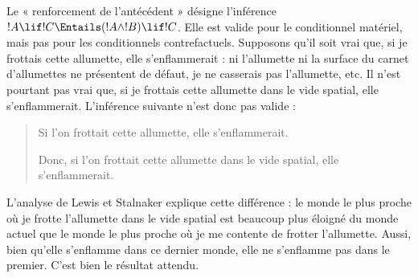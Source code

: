 \documentclass[../../../include/open-logic-section]{subfiles}
\begin{document}


Le « renforcement de l'antécédent » désigne l'inférence
$!A \lif !C \Entails (!A \land !B) \lif !C$. Elle est valide pour le
conditionnel matériel, mais pas pour les conditionnels
contrefactuels. Supposons qu'il soit vrai que, si je frottais cette
allumette, elle s'enflammerait : ni l'allumette ni la surface du
carnet d'allumettes ne présentent de défaut, je ne casserais pas
l'allumette, etc. Il n'est pourtant pas vrai que, si je frottais
cette allumette dans le vide spatial, elle s'enflammerait. L'inférence
suivante n'est donc pas valide :
\begin{quote}
  Si l'on frottait cette allumette, elle s'enflammerait.

  Donc, si l'on frottait cette allumette dans le vide spatial, elle
  s'enflammerait.
\end{quote}

L'analyse de Lewis et Stalnaker explique cette différence : le monde
le plus proche où je frotte l'allumette dans le vide spatial est
beaucoup plus éloigné du monde actuel que le monde le plus proche où
je me contente de frotter l'allumette. Aussi, bien qu'elle
s'enflamme dans ce dernier monde, elle ne s'enflamme pas dans le
premier. C'est bien le résultat attendu.
\end{document}
